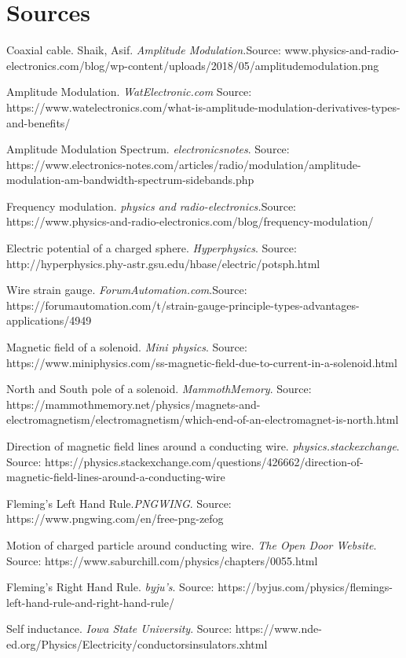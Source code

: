\documentclass{article}
\begin{document}
\section*{Sources}
\begin{flushleft}

Coaxial cable. Shaik, Asif. \textit{Amplitude Modulation.}Source: www.physics-and-radio-electronics.com/blog/wp-content/uploads/2018/05/amplitudemodulation.png

Amplitude Modulation. \textit{WatElectronic.com} Source: https://www.watelectronics.com/what-is-amplitude-modulation-derivatives-types-and-benefits/

Amplitude Modulation Spectrum. \textit{electronicsnotes}. Source: https://www.electronics-notes.com/articles/radio/modulation/amplitude-modulation-am-bandwidth-spectrum-sidebands.php

Frequency modulation. \textit{physics and radio-electronics.}Source: https://www.physics-and-radio-electronics.com/blog/frequency-modulation/

Electric potential of a charged sphere. \textit{Hyperphysics}. Source: http://hyperphysics.phy-astr.gsu.edu/hbase/electric/potsph.html

Wire strain gauge. \textit{ForumAutomation.com}.Source: https://forumautomation.com/t/strain-gauge-principle-types-advantages-applications/4949

Magnetic field of a solenoid. \textit{Mini physics}. Source: https://www.miniphysics.com/ss-magnetic-field-due-to-current-in-a-solenoid.html

North and South pole of a solenoid. \textit{MammothMemory}. Source: https://mammothmemory.net/physics/magnets-and-electromagnetism/electromagnetism/which-end-of-an-electromagnet-is-north.html

Direction of magnetic field lines around a conducting wire. \textit{physics.stackexchange}. Source: https://physics.stackexchange.com/questions/426662/direction-of-magnetic-field-lines-around-a-conducting-wire


Fleming's Left Hand Rule.\textit{PNGWING}. Source: https://www.pngwing.com/en/free-png-zefog

Motion of charged particle around conducting wire. \textit{The Open Door Website}. Source: https://www.saburchill.com/physics/chapters/0055.html

Fleming's Right Hand Rule. \textit{byju's}. Source: https://byjus.com/physics/flemings-left-hand-rule-and-right-hand-rule/

Self inductance. \textit{Iowa State University}. Source: https://www.nde-ed.org/Physics/Electricity/conductorsinsulators.xhtml


\end{flushleft}
\end{document}
